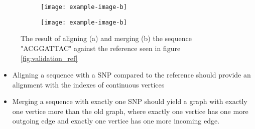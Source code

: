 \documentclass[thesis.tex]{subfiles}
\begin{document}
\begin{figure}[!h]
  \begin{subfigure}[t]{\textwidth}
    \texttt{[image: example-image-b]}
    \subcaption{}
  \end{subfigure}
  \begin{subfigure}[t]{\textwidth}
    \texttt{[image: example-image-b]}
    \subcaption{}
  \end{subfigure} 
  \caption{The result of aligning (a) and merging (b) the sequence "ACGGATTAC" against the reference seen in figure \ref{fig:validation_ref}}
  \label{fig:validation_single_snp}
\end{figure}
\begin{itemize}
  \item Aligning a sequence with a SNP compared to the reference should provide an alignment with the indexes of continuous vertices
  \item Merging a sequence with exactly one SNP should yield a graph with exactly one vertice more than the old graph, where exactly one vertice has one more outgoing edge and exactly one vertice has one more incoming edge.
\end{itemize}
\end{document}
